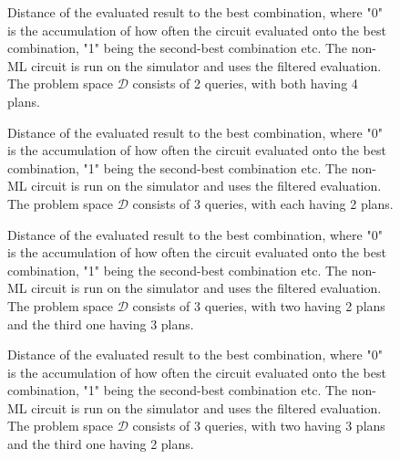 \begin{figure}[!h]
    \centering
    \scalebox{\resultboxplot}{
        
    }
    \caption{Distance of the evaluated result to the best combination, where "0" is the accumulation of how often the circuit evaluated onto the best combination, "1" being the second-best combination etc. The non-ML circuit is run on the simulator and uses the filtered evaluation. The problem space $\mathcal{D}$ consists of 2 queries, with both having 4 plans.}
    \label{figure:bars_dist_4_4}
\end{figure}

\begin{figure}[!h]
    \centering
    \scalebox{\resultboxplot}{
        
    }
    \caption{Distance of the evaluated result to the best combination, where "0" is the accumulation of how often the circuit evaluated onto the best combination, "1" being the second-best combination etc. The non-ML circuit is run on the simulator and uses the filtered evaluation. The problem space $\mathcal{D}$ consists of 3 queries, with each having 2 plans.}
    \label{figure:bars_dist_2_2_2}
\end{figure}

\begin{figure}[!h]
    \centering
    \scalebox{\resultboxplot}{
        
    }
    \caption{Distance of the evaluated result to the best combination, where "0" is the accumulation of how often the circuit evaluated onto the best combination, "1" being the second-best combination etc. The non-ML circuit is run on the simulator and uses the filtered evaluation. The problem space $\mathcal{D}$ consists of 3 queries, with two having 2 plans and the third one having 3 plans.}
    \label{figure:bars_dist_2_3_2}
\end{figure}

\begin{figure}[!h]
    \centering
    \scalebox{\resultboxplot}{
        
    }
    \caption{Distance of the evaluated result to the best combination, where "0" is the accumulation of how often the circuit evaluated onto the best combination, "1" being the second-best combination etc. The non-ML circuit is run on the simulator and uses the filtered evaluation. The problem space $\mathcal{D}$ consists of 3 queries, with two having 3 plans and the third one having 2 plans.}
    \label{figure:bars_dist_3_2_3}
\end{figure}

